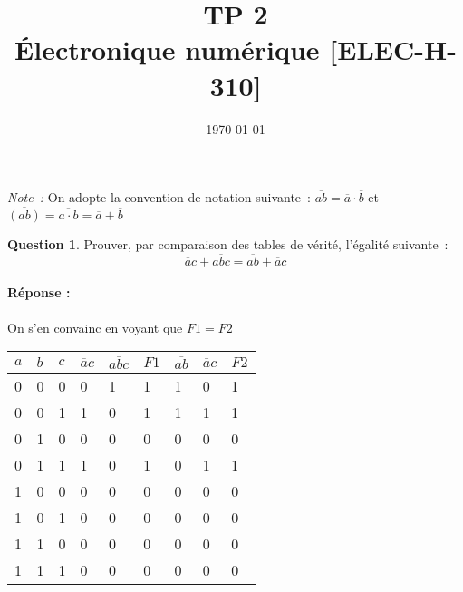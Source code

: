 \documentclass[11pt,a4paper,dvipsnames]{article}
\date{\vspace{-1.7cm}\mydate\today}
\title{\vspace{-2cm} TP 2\\ Électronique numérique [ELEC-H-310] \ifthenelse{\boolean{corrige}}{~\\Corrigé}{}}
\theoremstyle{definition}%
\newtheorem{Q}{Question}[] %
\newcommand{\reponse}[1]{%
	\ifthenelse {\boolean{corrige}} {\paragraph{Réponse :} \color{darkblue}   #1\color{black}} {}
 }
\begin{document}
\pagestyle{empty}
\maketitle
\vspace*{1cm}

\textit{Note~:} On adopte la convention de notation suivante~: $\overline{ab} = \overline{a} \cdot \overline{b}$ et $\overline{(ab)} = \overline{a \cdot b} = \overline{a} + \overline{b}$
\begin{Q}
	Prouver, par comparaison des tables de vérité, l'égalité suivante~:
	\[\overline{a}c + \overline{abc} = \overline{ab} + \overline{a}c\]
	\label{Q:1}
	\reponse{On s'en convainc en voyant que $F1 = F2$

		\renewcommand{\arraystretch}{1.2}
		\begin{center}
			\begin{tabular}{|l|l|l|l|l|l|l|l|l|} \hline
				$a$ & $b$ & $c$ & $\overline{a}c$ & $\overline{abc}$ & $F1$ & $\overline{ab}$ & $\overline{a}c$ & $F2$ \\ \hline
				0 & 0 & 0 & 0 & 1 & 1 & 1 & 0 & 1 \\ \hline
				0 & 0 & 1 & 1 & 0 & 1 & 1 & 1 & 1 \\ \hline
				0 & 1 & 0 & 0 & 0 & 0 & 0 & 0 & 0 \\ \hline
				0 & 1 & 1 & 1 & 0 & 1 & 0 & 1 & 1 \\ \hline
				1 & 0 & 0 & 0 & 0 & 0 & 0 & 0 & 0 \\ \hline
				1 & 0 & 1 & 0 & 0 & 0 & 0 & 0 & 0 \\ \hline
				1 & 1 & 0 & 0 & 0 & 0 & 0 & 0 & 0 \\ \hline
				1 & 1 & 1 & 0 & 0 & 0 & 0 & 0 & 0 \\ \hline
			\end{tabular}
		\end{center}
	}%
\end{Q}
\end{document}
